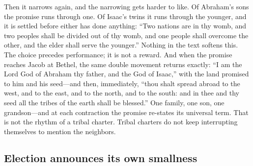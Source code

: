 Then it narrows again, and the narrowing gets harder to like. Of Abraham's sons the promise runs through one. Of Isaac's twins it runs through the younger, and it is settled before either has done anything: ``Two nations are in thy womb, and two peoples shall be divided out of thy womb, and one people shall overcome the other, and the elder shall serve the younger.'' Nothing in the text softens this. The choice precedes performance; it is not a reward. And when the promise reaches Jacob at Bethel, the same double movement returns exactly: ``I am the Lord God of Abraham thy father, and the God of Isaac,'' with the land promised to him and his seed---and then, immediately, ``thou shalt spread abroad to the west, and to the east, and to the north, and to the south: and in thee and thy seed all the tribes of the earth shall be blessed.'' One family, one son, one grandson---and at each contraction the promise re-states its universal term. That is not the rhythm of a tribal charter. Tribal charters do not keep interrupting themselves to mention the neighbors.

\subsection{Election announces its own smallness}

